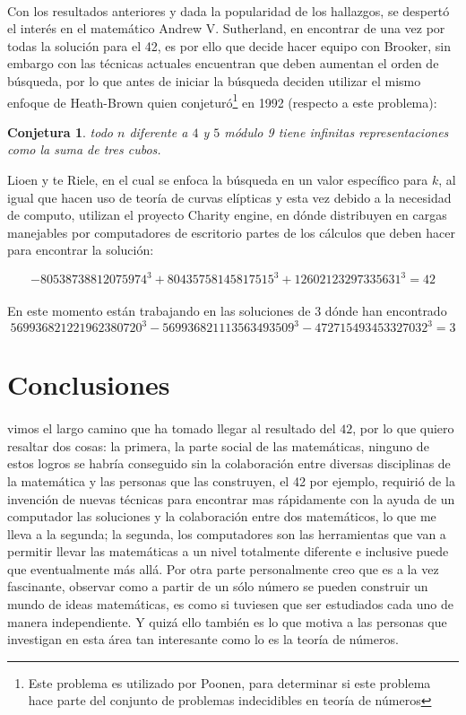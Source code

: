 \documentclass{article}
\newtheorem{conjecture}{Conjetura}[]
\begin{document}
\paragraph{} Con los resultados anteriores y dada la popularidad de los hallazgos, se despertó el interés en el matemático Andrew V. Sutherland, en encontrar de una vez por todas la solución para el 42, es por ello que decide hacer equipo con Brooker, sin embargo con las técnicas actuales encuentran que deben aumentan el orden de búsqueda, por lo que antes de iniciar la búsqueda deciden utilizar el mismo enfoque de Heath-Brown quien conjeturó\footnote{Este problema es utilizado por Poonen, para determinar si este problema hace parte del conjunto de problemas indecidibles en teoría de números\cite{Bjorn}} en 1992 (respecto a este problema):
\begin{conjecture}
	todo $n$ diferente a $4$ y $5$ módulo 9 tiene infinitas representaciones como la suma de tres cubos.
\end{conjecture}
Lioen y te Riele, en el cual se enfoca la búsqueda en un valor específico para $k$, al igual que hacen uso de teoría de curvas elípticas y esta vez debido a la necesidad de computo, utilizan el proyecto Charity engine, en dónde distribuyen en cargas manejables por computadores de escritorio partes de los cálculos que deben hacer para encontrar la solución:

$$-80538738812075974^3 + 80435758145817515^3 + 12602123297335631^3 = 42$$

\paragraph{}En este momento están trabajando en las soluciones de $3$ dónde han encontrado
$$569936821221962380720^3 -569936821113563493509^3 -472715493453327032^3 = 3$$

\section*{Conclusiones}
\paragraph{}vimos el largo camino que ha tomado llegar al resultado del $42$, por lo que quiero resaltar dos cosas: la primera, la parte social de las matemáticas, ninguno de estos logros se habría conseguido sin la colaboración entre diversas disciplinas de la matemática y las personas que las construyen, el 42 por ejemplo, requirió de la invención de nuevas técnicas para encontrar mas rápidamente con la ayuda de un computador las soluciones y la colaboración entre dos matemáticos, lo que me lleva a la segunda; la segunda, los computadores son las herramientas que van a permitir llevar las matemáticas a un nivel totalmente diferente e inclusive puede que eventualmente más allá. Por otra parte personalmente creo que es a la vez fascinante, observar como a partir de un sólo número se pueden construir un mundo de ideas matemáticas, es como si tuviesen que ser estudiados cada uno de manera independiente. Y quizá ello también es lo que motiva a las personas que investigan en esta área tan interesante como lo es la teoría de números.

\nocite{*}

\end{document}
